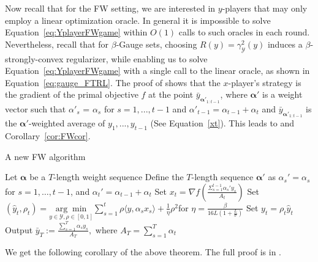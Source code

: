 \documentclass[final,12pt]{colt2018} %
\def\balpha{\boldsymbol{\alpha}}
\newcommand{\YY}{\mathcal{Y}}
\begin{document}
Now recall that for the FW setting, we are interested in $y$-players that may only employ a linear optimization oracle. In general it is impossible to solve Equation~\eqref{eq:YplayerFWgame} within $O(1)$ calls to such oracles in each round. Nevertheless, recall that for $\beta$-Gauge sets, choosing $R(y) = \gamma_{\YY}^2(y)$ induces a 
$\beta$-strongly-convex regularizer, while enabling us to solve Equation~\eqref{eq:YplayerFWgame} with a single call to the linear oracle, as shown in Equation~\ref{eq:gauge_FTRL}. The proof of  shows that the $x$-player's strategy is the gradient of the primal objective $f$ at the point $\bar{y}_{\balpha'_{1:t-1}}$, where $\balpha'$ is a weight vector such that $\alpha'_s$ = $\alpha_s$ for $s = 1,...,t-1$ and $\alpha'_{t-1} = \alpha_{t-1} + \alpha_t$ and $\bar{y}_{\balpha'_{1:t-1}}$ is the $\balpha'$-weighted average of $y_1,...,y_{t-1}$ (See Equation~\ref{xt}). This leads to  and Corollary~\ref{cor:FWcor}.

\begin{algorithm}[h] 
	\caption{A new FW algorithm}
	\label{alg:FW}
	\begin{algorithmic}[1]
		\STATE Let $\balpha$ be a $T$-length weight sequence 
		\STATE Define the $T$-length sequence $\balpha'$ as $\alpha_{s}' = \alpha_s $ for $s=1,\ldots, t-1$, and $\alpha_{t}' = \alpha_{t-1} + \alpha_t$
		\STATE  Set $x_t = \nabla f( \frac{\Sigma_{{s=1}}^{t-1} \alpha_s' y_s}{ A_t})$
		\STATE  Set	$(\hat{y}_t, \rho_t) = \underset{y \in \YY, \rho \in[0,1] }{\arg\min} \sum_{s=1}^t \rho \langle  y, \alpha_s x_s \rangle  +  \frac{1}{\eta} \rho^2$\quad for $\eta = \frac{\beta }{ 16L ( 1 + \frac{L}{\sigma})}$
		\STATE Set $y_t = \rho_t \hat{y}_t$                  
		\ENDFOR
		\STATE Output $\bar{y}_{T} := \frac{ \sum_{s=1}^T \alpha_s y_s  }{ A_T },$ where $A_{T}= \sum_{s=1}^T \alpha_{t}$
	\end{algorithmic}
\end{algorithm}



We get the following corollary of the above theorem. The full proof is in . 
\end{document}
